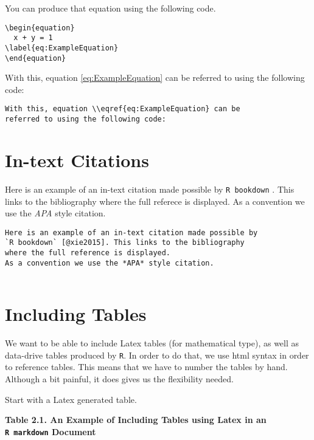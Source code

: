 \documentclass[
]{book}
\begin{document}
You can produce that equation using the following code.

\begin{verbatim}
\begin{equation}
  x + y = 1  
\label{eq:ExampleEquation}
\end{equation}
\end{verbatim}

With this, equation \eqref{eq:ExampleEquation} can be referred to using the following code:

\begin{verbatim}
With this, equation \\eqref{eq:ExampleEquation} can be 
referred to using the following code:
\end{verbatim}

\hypertarget{in-text-citations}{%
\section{In-text Citations}\label{in-text-citations}}

Here is an example of an in-text citation made possible by \texttt{R\ bookdown} \citep{xie2015}. This links to the bibliography where the full referece is displayed. As a convention we use the \emph{APA} style citation.

\begin{verbatim}
Here is an example of an in-text citation made possible by 
`R bookdown` [@xie2015]. This links to the bibliography 
where the full reference is displayed. 
As a convention we use the *APA* style citation.
    
\end{verbatim}

\hypertarget{including-tables}{%
\section{Including Tables}\label{including-tables}}

We want to be able to include Latex tables (for mathematical type), as well as data-drive tables produced by \texttt{R}. In order to do that, we use html syntax in order to reference tables. This means that we have to number the tables by hand. Although a bit painful, it does gives us the flexibility needed.

Start with a Latex generated table.

\textbf{Table 2.1. An Example of Including Tables using Latex in an \texttt{R\ markdown} Document}
\end{document}

